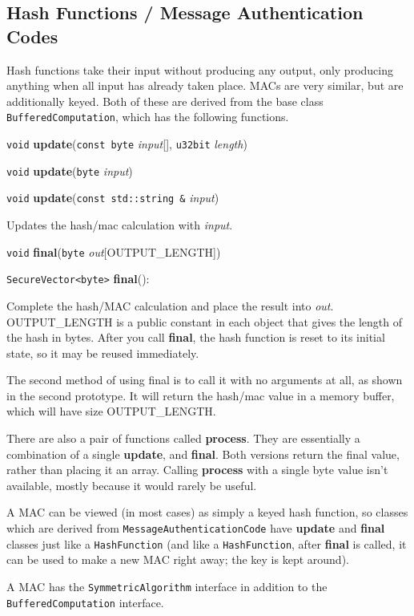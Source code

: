 \documentclass{article}
\newcommand{\function}[1]{\textbf{#1}}
\newcommand{\type}[1]{\texttt{#1}}
\renewcommand{\arg}[1]{\textsl{#1}}
\begin{document}
\subsection{Hash Functions / Message Authentication Codes}

Hash functions take their input without producing any output, only producing
anything when all input has already taken place. MACs are very similar, but are
additionally keyed. Both of these are derived from the base class
\type{BufferedComputation}, which has the following functions.

\noindent
\type{void} \function{update}(\type{const byte} \arg{input}[], \type{u32bit}
\arg{length})

\noindent
\type{void} \function{update}(\type{byte} \arg{input})

\noindent
\type{void} \function{update}(\type{const std::string \&} \arg{input})

Updates the hash/mac calculation with \arg{input}.

\noindent
\type{void} \function{final}(\type{byte} \arg{out}[OUTPUT\_LENGTH])

\noindent
\type{SecureVector<byte>} \function{final}():

Complete the hash/MAC calculation and place the result into \arg{out}.
OUTPUT\_LENGTH is a public constant in each object that gives the length of the
hash in bytes. After you call \function{final}, the hash function is reset to
its initial state, so it may be reused immediately.

The second method of using final is to call it with no arguments at all, as
shown in the second prototype. It will return the hash/mac value in a memory
buffer, which will have size OUTPUT\_LENGTH.

There are also a pair of functions called \function{process}. They are
essentially a combination of a single \function{update}, and \function{final}.
Both versions return the final value, rather than placing it an array. Calling
\function{process} with a single byte value isn't available, mostly because it
would rarely be useful.

A MAC can be viewed (in most cases) as simply a keyed hash function, so classes
which are derived from \type{MessageAuthenticationCode} have \function{update}
and \function{final} classes just like a \type{HashFunction} (and like a
\type{HashFunction}, after \function{final} is called, it can be used to make a
new MAC right away; the key is kept around).

A MAC has the \type{SymmetricAlgorithm} interface in addition to the
\type{BufferedComputation} interface.
\end{document}
